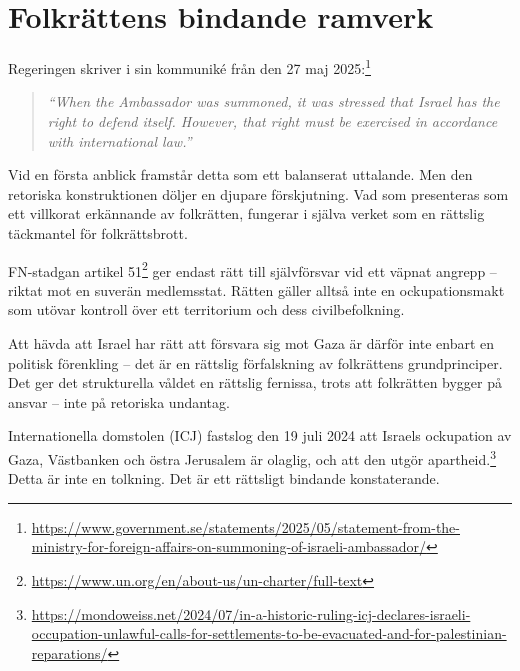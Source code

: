 
\section{Folkrättens bindande ramverk}



Regeringen skriver i sin kommuniké från den 27 maj 2025:\footnote{\url{https://www.government.se/statements/2025/05/statement-from-the-ministry-for-foreign-affairs-on-summoning-of-israeli-ambassador/}}

\begin{quote}
\textit{“When the Ambassador was summoned, it was stressed that Israel has the right to defend itself. However, that right must be exercised in accordance with international law.”}
\end{quote}

Vid en första anblick framstår detta som ett balanserat uttalande. Men den retoriska konstruktionen döljer en djupare förskjutning. Vad som presenteras som ett villkorat erkännande av folkrätten, fungerar i själva verket som en rättslig täckmantel för folkrättsbrott.

FN-stadgan artikel 51\footnote{\url{https://www.un.org/en/about-us/un-charter/full-text}} ger endast rätt till självförsvar vid ett väpnat angrepp – riktat mot en suverän medlemsstat. Rätten gäller alltså inte en ockupationsmakt som utövar kontroll över ett territorium och dess civilbefolkning.


Att hävda att Israel har rätt att försvara sig mot Gaza är därför inte enbart en politisk förenkling – det är en rättslig förfalskning av folkrättens grundprinciper. Det ger det strukturella våldet en rättslig fernissa, trots att folkrätten bygger på ansvar – inte på retoriska undantag.

Internationella domstolen (ICJ) fastslog den 19 juli 2024 att Israels ockupation av Gaza, Västbanken och östra Jerusalem är olaglig, och att den utgör apartheid.\footnote{\url{https://mondoweiss.net/2024/07/in-a-historic-ruling-icj-declares-israeli-occupation-unlawful-calls-for-settlements-to-be-evacuated-and-for-palestinian-reparations/}} Detta är inte en tolkning. Det är ett rättsligt bindande konstaterande.

